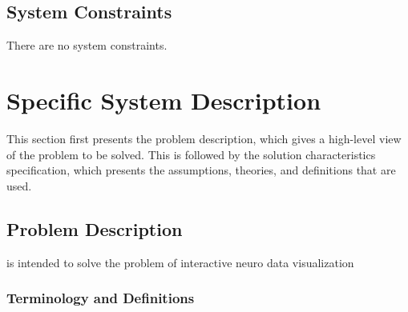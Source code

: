\documentclass[12pt]{article}
\begin{document}
\subsection{System Constraints}

There are no system constraints.


\section{Specific System Description}

This section first presents the problem description, which gives a high-level view of
the problem to be solved. This is followed by the solution characteristics specification,
which presents the assumptions, theories, and definitions that are used.


\subsection{Problem Description} \label{Sec_pd}

\progname{} is intended to solve the problem of interactive neuro data visualization

\subsubsection{Terminology and  Definitions}

\end{document}
